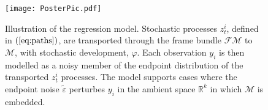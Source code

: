 \documentclass[runningheads,a4paper]{llncs}
\newcommand{\R}{\mathbb R}
\newcommand{\M}{\mathcal{M}}
\newcommand{\FM}{\mathcal{FM}}
\begin{document}
%
%

\begin{figure}
\centering
\texttt{[image: PosterPic.pdf]}
\caption{Illustration of the regression model. Stochastic processes $z_t^{i}$, defined in $(\ref{eq:paths})$, are transported through the frame bundle $\FM$ to $\M$, with stochastic development, $\varphi$. Each observation $y_i$ is then modelled as a noisy member of the endpoint distribution of the transported $z_t^{i}$ processes. The model supports cases where the endpoint noise $\tilde{\varepsilon}$ perturbes $y_i$ in the ambient space $\R^k$ in which $\M$ is embedded.}
\label{fig:LinFig}
\end{figure}
\end{document}
